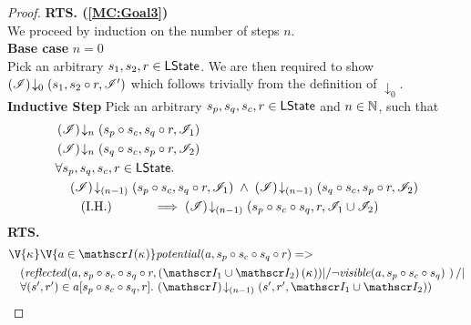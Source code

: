 \begin{lemma}
\begin{proof}
\noindent\textbf{RTS. (\ref{MC:Goal3})} \\
We proceed by induction on the number of steps $n$.\\

\noindent\textbf{Base case }$n=0$\\
Pick an arbitrary $s_1, s_2, r \in \textsf{LState}$. We are then required to show	$\left(\mathscr{I}\right) \!\downarrow_{0} \left(s_1, s_2 \circ r, \mathscr{I}'\right) $ which follows trivially from the definition of $\downarrow_0$.\\

\noindent\textbf{Inductive Step} Pick an arbitrary $s_p, s_q, s_c, r \in \textsf{LState}$ and $n \in \mathbb{N}$, such that
%
\begin{align}
	& \left(\mathscr{I}\right) \!\downarrow_{n} \left(s_p \circ s_c, s_q \circ r, \mathscr{I}_{1}\right) \label{LMC:Ass1}\\
	& \left(\mathscr{I}\right) \!\downarrow_{n} \left(s_q \circ s_c, s_p \circ r, \mathscr{I}_{2}\right) \label{LMC:Ass2}\\
	& \forall s_p, s_q, s_c, r \in \textsf{LState}.\, \nonumber \\
	&	\quad \left(\mathscr{I}\right) \!\downarrow_{(n-1)} \left(s_p \circ s_c, s_q \circ r, \mathscr{I}_{1}\right) \;\land\; \left(\mathscr{I}\right) \!\downarrow_{(n-1)} \left(s_q \circ s_c, s_p \circ r, \mathscr{I}_{2}\right) \nonumber \\
	&	\tag{I.H.} \qquad\quad\implies  \left(\mathscr{I}\right) \!\downarrow_{(n-1)} \left(s_p \circ s_c \circ s_q, r, \mathscr{I}_{1} \cup \mathscr{I}_{2}\right) \label{LMC:IH}
\end{align}
%
%
\noindent\textbf{RTS.}
%
\begin{align}
%  
  &\V{\ca{}}\V{a\in \lmod(\ca{})}
  \m{potential}(a,s_p \composeL s_c \composeL s_q \composeL r) =>\null \nonumber \\
  &\quad 
	\begin{array}{@{} l @{}}
		\left(\m{reflected}(a,s_p \composeL s_c \composeL s_q \composeL r, \left( \lmod_1 \cup \lmod_2 \right)(\ca{})) |/ \neg\m{visible}(a,s_p \composeL s_c \composeL s_q) \ \right) /| \\
		\for{(s', r') \in a[s_p \composeL s_c \composeL s_q, r]} \extendsAMUpto{\lmod}{(n-1)}{s'}{r'}{\lmod_1 \cup \lmod_2})
	\end{array}	  
	\nonumber
\end{align}
%
%
%



\end{proof}
\end{lemma}
